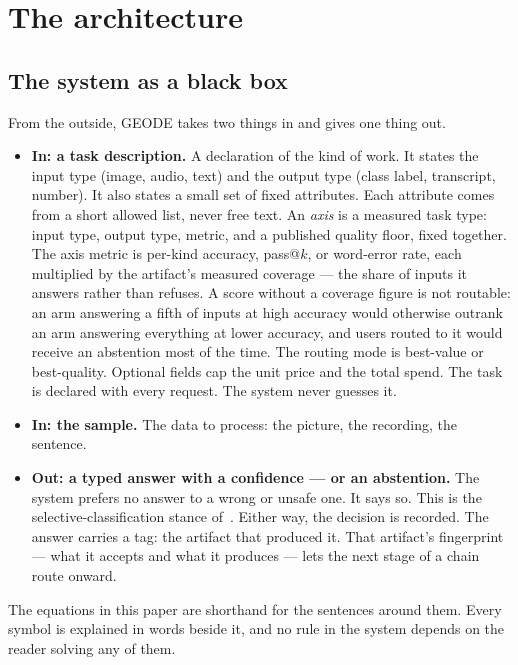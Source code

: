 \documentclass[11pt]{article}
\begin{document}
\section{The architecture}

\subsection{The system as a black box}

From the outside, GEODE takes two things in and gives one thing out.

\begin{itemize}
\item \textbf{In: a task description.} A declaration of the kind of
work. It states the input type (image, audio, text) and the
output type (class label, transcript, number). It also states a
small set of fixed attributes. Each attribute comes from a short
allowed list, never free text. An \emph{axis} is a measured task
type: input type, output type, metric, and a published quality
floor, fixed together. The axis metric is per-kind accuracy,
pass@$k$, or word-error rate, each multiplied by the artifact's
measured coverage --- the share of inputs it answers rather than
refuses. A score without a coverage figure is not routable: an
arm answering a fifth of inputs at high accuracy would otherwise
outrank an arm answering everything at lower accuracy, and users
routed to it would receive an abstention most of the time. The
routing mode is
best-value or best-quality. Optional fields cap the unit price
and the total spend. The task is declared with every request. The
system never guesses it.
\item \textbf{In: the sample.} The data to process: the picture,
the recording, the sentence.
\item \textbf{Out: a typed answer with a confidence --- or an
abstention.} The system prefers no answer to a wrong or unsafe
one. It says so. This is the selective-classification stance
of~\cite{geifman2017}. Either way, the decision is recorded. The
answer carries a tag: the artifact that produced it. That
artifact's fingerprint --- what it accepts and what it produces ---
lets the next stage of a chain route onward.
\end{itemize}

The equations in this paper are shorthand for the sentences
around them. Every symbol is explained in words beside it, and
no rule in the system depends on the reader solving any of them.
\end{document}
